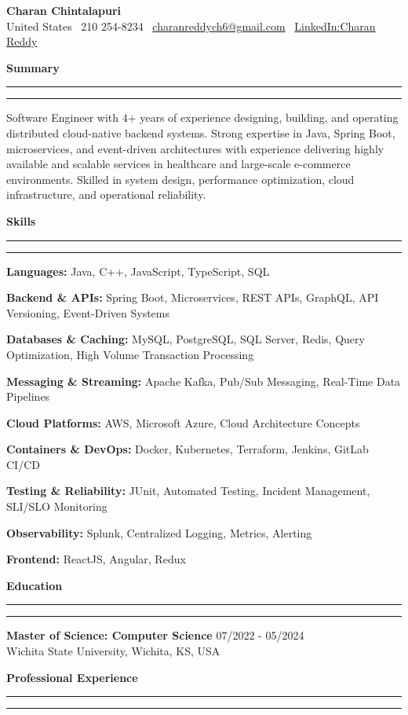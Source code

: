\documentclass[10pt,letterpaper]{article}
\newcommand{\sectionline}{
  \vspace{2pt}
  \hrule
  \hrule
  \vspace{6pt}
}
\begin{document}
\begin{center}
\textbf{\Large Charan Chintalapuri}\\
United States \textbar\ 210 254-8234 \textbar\
\href{mailto:charanreddych6@gmail.com}{charanreddych6@gmail.com}
\textbar\
\href{https://www.linkedin.com/in/charan-reddy-787b72234/}{LinkedIn:Charan Reddy}
\end{center}

\textbf{Summary}
\sectionline

Software Engineer with 4+ years of experience designing, building, and operating distributed cloud-native backend systems. Strong expertise in Java, Spring Boot, microservices, and event-driven architectures with experience delivering highly available and scalable services in healthcare and large-scale e-commerce environments. Skilled in system design, performance optimization, cloud infrastructure, and operational reliability.



\vspace{4pt}
\textbf{Skills}
\sectionline

\textbf{Languages:} Java, C++, JavaScript, TypeScript, SQL

\textbf{Backend \& APIs:} Spring Boot, Microservices, REST APIs, GraphQL, API Versioning, Event-Driven Systems

\textbf{Databases \& Caching:} MySQL, PostgreSQL, SQL Server, Redis, Query Optimization, High Volume Transaction Processing

\textbf{Messaging \& Streaming:} Apache Kafka, Pub/Sub Messaging, Real-Time Data Pipelines

\textbf{Cloud Platforms:} AWS, Microsoft Azure, Cloud Architecture Concepts

\textbf{Containers \& DevOps:} Docker, Kubernetes, Terraform, Jenkins, GitLab CI/CD

\textbf{Testing \& Reliability:} JUnit, Automated Testing, Incident Management, SLI/SLO Monitoring

\textbf{Observability:} Splunk, Centralized Logging, Metrics, Alerting

\textbf{Frontend:} ReactJS, Angular, Redux

\vspace{4pt}
\textbf{Education}
\sectionline

\textbf{Master of Science: Computer Science} \hfill 07/2022 - 05/2024\\
Wichita State University, Wichita, KS, USA

\vspace{4pt}
\textbf{Professional Experience}
\sectionline
\end{document}
